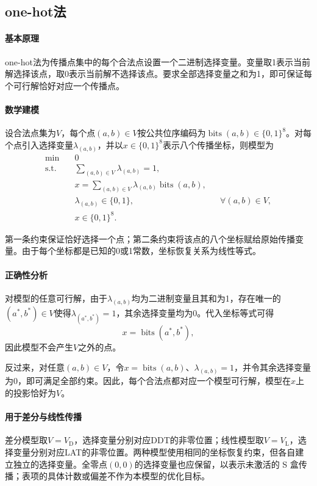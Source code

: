 \subsection{one-hot法}
\label{subsec:lab4-one-hot}

\paragraph{基本原理}

one-hot法为传播点集中的每个合法点设置一个二进制选择变量。变量取1表示当前解选择该点，取0表示当前解不选择该点。要求全部选择变量之和为1，即可保证每个可行解恰好对应一个传播点。

\paragraph{数学建模}

设合法点集为$V$，每个点$(a,b)\in V$按公共位序编码为$\operatorname{bits}(a,b)\in\{0,1\}^8$。对每个点引入选择变量$\lambda_{(a,b)}$，并以$x\in\{0,1\}^8$表示八个传播坐标，则模型为
\begin{equation}
\begin{aligned}
\min\quad &0\\
\text{s.t.}\quad
&\sum_{(a,b)\in V}\lambda_{(a,b)}=1,\\
&x=\sum_{(a,b)\in V}\lambda_{(a,b)}\operatorname{bits}(a,b),\\
&\lambda_{(a,b)}\in\{0,1\},
&&\forall(a,b)\in V,\\
&x\in\{0,1\}^8.
\end{aligned}
\label{eq:lab4-one-hot-model}
\end{equation}

第一条约束保证恰好选择一个点；第二条约束将该点的八个坐标赋给原始传播变量。由于每个坐标都是已知的0或1常数，坐标恢复关系为线性等式。

\paragraph{正确性分析}

对模型的任意可行解，由于$\lambda_{(a,b)}$均为二进制变量且其和为1，存在唯一的$(a^*,b^*)\in V$使得$\lambda_{(a^*,b^*)}=1$，其余选择变量均为0。代入坐标等式可得
\[
x=\operatorname{bits}(a^*,b^*),
\]
因此模型不会产生$V$之外的点。

反过来，对任意$(a,b)\in V$，令$x=\operatorname{bits}(a,b)$、$\lambda_{(a,b)}=1$，并令其余选择变量为0，即可满足全部约束。因此，每个合法点都对应一个模型可行解，模型在$x$上的投影恰好为$V$。

\paragraph{用于差分与线性传播}

差分模型取$V=V_{\mathrm D}$，选择变量分别对应DDT的非零位置；线性模型取$V=V_{\mathrm L}$，选择变量分别对应LAT的非零位置。两种模型使用相同的坐标恢复约束，但各自建立独立的选择变量。全零点$(0,0)$的选择变量也应保留，以表示未激活的 S 盒传播；表项的具体计数或偏差不作为本模型的优化目标。
